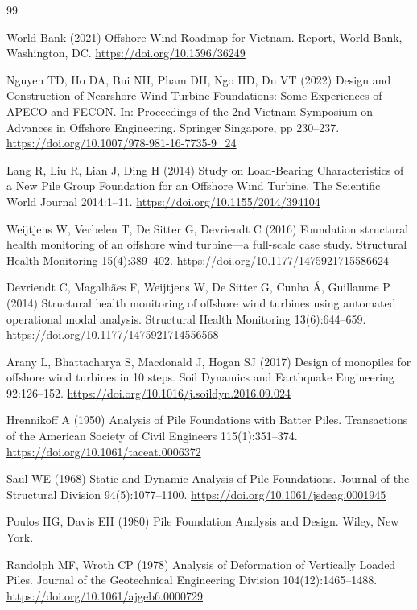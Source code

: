 \documentclass[11pt]{article}
\begin{document}
\begin{thebibliography}{99}

World Bank (2021) Offshore Wind Roadmap for Vietnam. Report, World Bank, Washington, DC. \url{https://doi.org/10.1596/36249}

Nguyen TD, Ho DA, Bui NH, Pham DH, Ngo HD, Du VT (2022) Design and Construction of Nearshore Wind Turbine Foundations: Some Experiences of APECO and FECON. In: Proceedings of the 2nd Vietnam Symposium on Advances in Offshore Engineering. Springer Singapore, pp 230--237. \url{https://doi.org/10.1007/978-981-16-7735-9_24}

Lang R, Liu R, Lian J, Ding H (2014) Study on Load-Bearing Characteristics of a New Pile Group Foundation for an Offshore Wind Turbine. The Scientific World Journal 2014:1--11. \url{https://doi.org/10.1155/2014/394104}

Weijtjens W, Verbelen T, De Sitter G, Devriendt C (2016) Foundation structural health monitoring of an offshore wind turbine---a full-scale case study. Structural Health Monitoring 15(4):389--402. \url{https://doi.org/10.1177/1475921715586624}

Devriendt C, Magalh{\~a}es F, Weijtjens W, De Sitter G, Cunha {\'A}, Guillaume P (2014) Structural health monitoring of offshore wind turbines using automated operational modal analysis. Structural Health Monitoring 13(6):644--659. \url{https://doi.org/10.1177/1475921714556568}

Arany L, Bhattacharya S, Macdonald J, Hogan SJ (2017) Design of monopiles for offshore wind turbines in 10 steps. Soil Dynamics and Earthquake Engineering 92:126--152. \url{https://doi.org/10.1016/j.soildyn.2016.09.024}

Hrennikoff A (1950) Analysis of Pile Foundations with Batter Piles. Transactions of the American Society of Civil Engineers 115(1):351--374. \url{https://doi.org/10.1061/taceat.0006372}

Saul WE (1968) Static and Dynamic Analysis of Pile Foundations. Journal of the Structural Division 94(5):1077--1100. \url{https://doi.org/10.1061/jsdeag.0001945}

Poulos HG, Davis EH (1980) Pile Foundation Analysis and Design. Wiley, New York.

Randolph MF, Wroth CP (1978) Analysis of Deformation of Vertically Loaded Piles. Journal of the Geotechnical Engineering Division 104(12):1465--1488. \url{https://doi.org/10.1061/ajgeb6.0000729}


\end{thebibliography}
\end{document}
